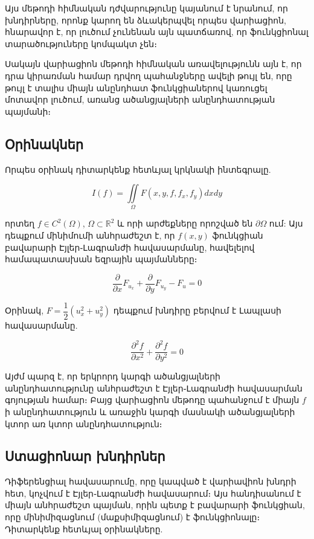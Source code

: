 \documentclass[fleqn, bachelor,subf,12pt,notitlepage]{disser}
\begin{document}
Այս  մեթոդի հիմնական դժվարությունը կայանում է նրանում, որ խնդիրները, որոնք կարող են ձևակերպվել որպես վարիացիոն, հնարավոր է, որ լուծում չունենան այն պատճառով, որ ֆունկցիոնալ տարածություները  կոմպակտ չեն։

Սակայն վարիացիոն մեթոդի հիմնական առավելությունն այն է, որ դրա կիրառման համար դրվող պահանջները ավելի թույլ են, որը թույլ է տալիս միայն անընդհատ \newpage ֆունկցիաներով կառուցել մոտավոր լուծում, առանց ածանցյալների անընդհատության պայմանի։

\newpage
\subsection*{Օրինակներ}

Որպես օրինակ դիտարկենք հետևյալ կրկնակի ինտեգրալը.

$$I\left(f\right)=\iint \limits_{\Omega} F\left(x, y, f, f_{x}, f_{y}\right)dxdy$$

\noindent որտեղ $f \in C^{2}(\Omega)$,  $\Omega\subset \mathbb{R}^{2}$ և որի արժեքները որոշված են $\partial \Omega$ ում:
\noindent Այս դեպքում մինիմումի անհրաժեշտ է, որ $f(x,y)$ ֆունկցիան բավարարի Էյլեր֊Լագրանժի հավասարմանը, հավելելով համապատասխան եզրային պայմանները։

$$\dfrac{\partial}{\partial x}F_{u_{x}} + \dfrac{\partial}{\partial y}F_{u_{y}} - F_{u} = 0$$

\noindent Օրինակ, $F = \dfrac{1}{2}\left(u_{x}^2+u_{y}^2\right)$ դեպքում խնդիրը բերվում է Լապլասի հավասարմանը.

$$\dfrac{\partial^{2}f}{\partial x^{2}} + \dfrac{\partial^{2}f}{\partial y^{2}} = 0$$


Այժմ պարզ է, որ երկրորդ կարգի ածանցյալների անընդհատությունը անհրաժեշտ է Էյլեր֊Լագրանժի հավասարման գոյության համար։ Բայց վարիացիոն մեթոդը պահանջում է միայն $f$ ի անընդհատություն և առաջին կարգի մասնակի ածանցյալների կտոր առ կտոր անընդհատություն։

\subsection*{Ստացիոնար խնդիրներ} %

Դիֆերենցիալ հավասարումը, որը կապված է վարիավիոն խնդրի հետ, կոչվում է Էյլեր֊Լագրանժի հավասարում։ Այս հանդիսանում է միայն անհրաժեշտ պայման, որին պետք է բավարարի ֆունկցիան, որը մինիմիզացնում (մաքսիմիզացնում) է ֆունկցիոնալը։ 
Դիտարկենք հետևյալ օրինակները.
\end{document}
